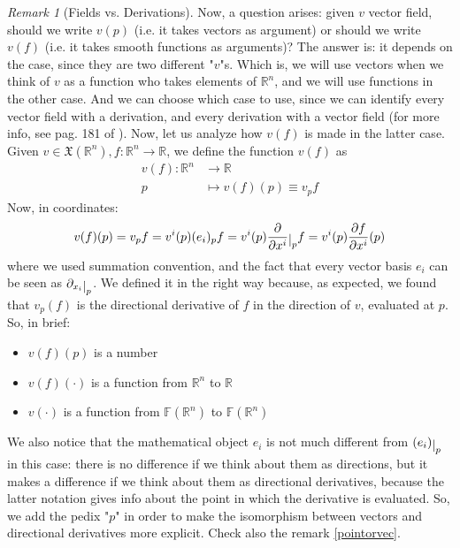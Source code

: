 \documentclass[a4paper,11pt,titlepage]{article}
\numberwithin{equation}{section}
\theoremstyle{definition}
\theoremstyle{remark}
\newtheorem{remark}[theorem]{Remark}
\newcommand{\rfield}{\mathbb{R}}
\newcommand{\restrict}[2]{{#1}\raisebox{-.5ex}{$|$}_{#2}}
\begin{document}
\begin{remark} [Fields vs. Derivations]
  Now, a question arises: given $v$ vector field, should we write $v(p)$ (i.e. it takes vectors as argument) or should we write $v(f)$ (i.e. it takes smooth functions as arguments)? The answer is: it depends on the case, since they are two different "$v$"s. Which is, we will use vectors when we think of $v$ as a function who takes elements of $\rfield^n$, and we will use functions in the other case. And we can choose which case to use, since we can identify every vector field with a derivation, and every derivation with a vector field (for more info, see pag. 181 of \cite{Lee}). Now, let us analyze how $v(f)$ is made in the latter case.
  Given $v \in \mathfrak{X}(\rfield^n), f: \rfield^n \rightarrow \rfield$, we define the function $v(f)$ as
  \begin{align} \label{vfpdef}
    v(f) \colon \rfield^n &\rightarrow \rfield \nonumber \\
    p & \mapsto v(f)(p) \equiv v_p f
  \end{align}
  Now, in coordinates:
  \begin{equation} \label{vfieldincoord}
    v(f)(p) = v_p f = v^i(p)(e_i)_p f = v^i(p) \restrict{\frac{\partial}{\partial x^i}}{p} f = v^i(p) \frac{\partial f}{\partial x^i} (p)
  \end{equation}
  where we used summation convention, and the fact that every vector basis $e_i$ can be seen as $\restrict{\partial_{x_i}}{p}$. We defined it in the right way because, as expected, we found that $v_p(f)$ is the directional derivative of $f$ in the direction of $v$, evaluated at $p$. So, in brief:
  \begin{itemize}
    \item $v(f)(p)$ is a number
    \item $v(f)(\cdot)$ is a function from $\rfield^n$ to $\rfield$
    \item $v(\cdot)$ is a function from $\mathbb{F}(\rfield^n)$ to $\mathbb{F}(\rfield^n)$
  \end{itemize}
We also notice that the mathematical object $e_i$ is not much different from $\restrict{(e_i)}{p}$ in this case: there is no difference if we think about them as directions, but it makes a difference if we think about them as directional derivatives, because the latter notation gives info about the point in which the derivative is evaluated. So, we add the pedix "$p$" in order to make the isomorphism between vectors and directional derivatives more explicit. Check also the remark \ref{pointorvec}.
\end{remark}
\end{document}
